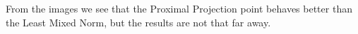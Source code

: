 \documentclass[12pt,a4paper,twoside]{report}
\begin{document}
{From the images we see that the Proximal Projection point behaves better than the Least Mixed Norm, but the results are not that far away. 
\begin{figure}
	\label{rsults}
	\centering
	 \\
	 \\

\end{figure}}
\end{document}

